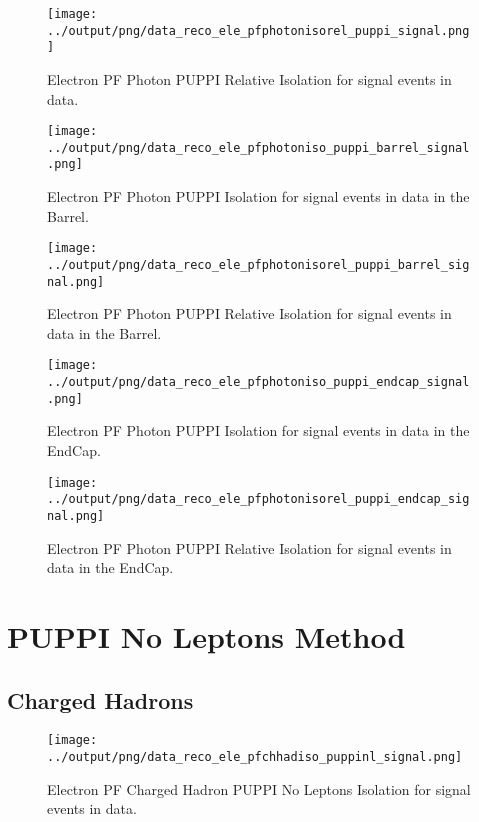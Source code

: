 \documentclass[11pt]{book}
\begin{document}
\begin{figure}[htb]
\centering
\texttt{[image: ../output/png/data\_reco\_ele\_pfphotonisorel\_puppi\_signal.png]}
\caption{Electron PF Photon PUPPI Relative Isolation for signal events in data.}
\label{fig:data_ele_pfphotonisorel_puppi_signal}
\end{figure}

\begin{figure}[htb]
\centering
\texttt{[image: ../output/png/data\_reco\_ele\_pfphotoniso\_puppi\_barrel\_signal.png]}
\caption{Electron PF Photon PUPPI Isolation for signal events in data in the Barrel.}
\label{fig:data_ele_pfphotoniso_puppi_barrel_signal}
\end{figure}

\begin{figure}[htb]
\centering
\texttt{[image: ../output/png/data\_reco\_ele\_pfphotonisorel\_puppi\_barrel\_signal.png]}
\caption{Electron PF Photon PUPPI Relative Isolation for signal events in data in the Barrel.}
\label{fig:data_ele_pfphotonisorel_puppi_barrel_signal}
\end{figure}

\begin{figure}[htb]
\centering
\texttt{[image: ../output/png/data\_reco\_ele\_pfphotoniso\_puppi\_endcap\_signal.png]}
\caption{Electron PF Photon PUPPI Isolation for signal events in data in the EndCap.}
\label{fig:data_ele_pfphotoniso_puppi_endcap_signal}
\end{figure}

\begin{figure}[htb]
\centering
\texttt{[image: ../output/png/data\_reco\_ele\_pfphotonisorel\_puppi\_endcap\_signal.png]}
\caption{Electron PF Photon PUPPI Relative Isolation for signal events in data in the EndCap.}
\label{fig:data_ele_pfphotonisorel_puppi_endcap_signal}
\end{figure}
\clearpage

\section{PUPPI No Leptons Method}
\subsection{Charged Hadrons}
\begin{figure}[htb]
\centering
\texttt{[image: ../output/png/data\_reco\_ele\_pfchhadiso\_puppinl\_signal.png]}
\caption{Electron PF Charged Hadron PUPPI No Leptons Isolation for signal events in data.}
\label{fig:data_ele_pfchhadiso_puppinl_signal}
\end{figure}
\end{document}
